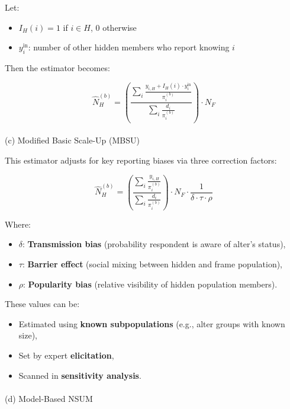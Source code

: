 \documentclass[
  12pt,
  letterpaper,
  DIV=11,
  numbers=noendperiod]{scrartcl}
\makeatletter
\let\oldparagraph\paragraph
\renewcommand{\paragraph}{
    \@ifstar
      \xxxParagraphStar
      \xxxParagraphNoStar
  }
\newcommand{\xxxParagraphStar}[1]{\oldparagraph*{#1}\mbox{}}
\newcommand{\xxxParagraphNoStar}[1]{\oldparagraph{#1}\mbox{}}
\theoremstyle{plain}
\theoremstyle{definition}
\makeatother
\begin{document}
Let:

\begin{itemize}
\item
  \(I_H(i) = 1\) if \(i \in H\), 0 otherwise
\item
  \(y_{i}^{\text{in}}\): number of other hidden members who report
  knowing \(i\)
\end{itemize}

Then the estimator becomes:

\[\hat{N}_H^{(b)} = \left( \frac{\sum_{i} \frac{y_{i,H} + I_H(i) \cdot y_{i}^{\text{in}}}{\pi_i^{(b)}}}{\sum_{i} \frac{d_i}{\pi_i^{(b)}}} \right) \cdot N_F\]

\paragraph{(c) Modified Basic Scale-Up
(MBSU)}\label{c-modified-basic-scale-up-mbsu}

This estimator adjusts for key reporting biases via three correction
factors:

\[\hat{N}_H^{(b)} = \left( \frac{\sum_{i} \frac{y_{i,H}}{\pi_i^{(b)}}}{\sum_{i} \frac{d_i}{\pi_i^{(b)}}} \right) \cdot N_F \cdot \frac{1}{\delta \cdot \tau \cdot \rho}\]

Where:

\begin{itemize}
\item
  \(\delta\): \textbf{Transmission bias} (probability respondent is
  aware of alter's status),
\item
  \(\tau\): \textbf{Barrier effect} (social mixing between hidden and
  frame population),
\item
  \(\rho\): \textbf{Popularity bias} (relative visibility of hidden
  population members).
\end{itemize}

These values can be:

\begin{itemize}
\item
  Estimated using \textbf{known subpopulations} (e.g., alter groups with
  known size),
\item
  Set by expert \textbf{elicitation},
\item
  Scanned in \textbf{sensitivity analysis}.
\end{itemize}

\paragraph{(d) Model-Based NSUM}\label{d-model-based-nsum}
\end{document}
